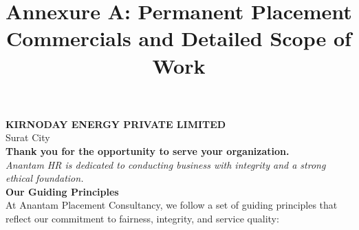 \documentclass{article}
\title{\textbf{\color{primary} Annexure A: Permanent Placement Commercials and Detailed Scope of Work}}
\date{}
\begin{document}
\maketitle

\noindent\textbf{KIRNODAY ENERGY PRIVATE LIMITED}\\
Surat City\\[1em]

\noindent\textbf{Thank you for the opportunity to serve your organization.}\\[0.5em]
\noindent\textit{Anantam HR is dedicated to conducting business with integrity and a strong ethical foundation.}\\[1em]

\noindent\textbf{\color{secondary} Our Guiding Principles}\\[0.5em]
\noindent At Anantam Placement Consultancy, we follow a set of guiding principles that reflect our commitment to fairness, integrity, and service quality:
\end{document}
